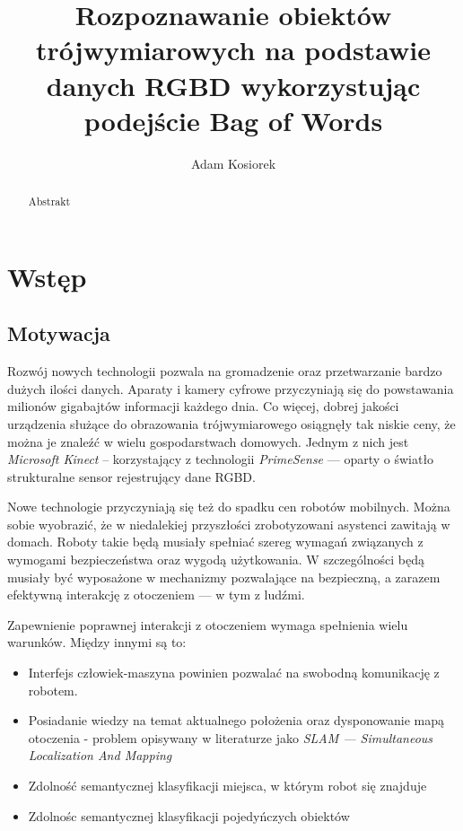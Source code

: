 \documentclass[a4paper,10pt]{article}
\title{Rozpoznawanie obiektów trójwymiarowych na podstawie danych RGBD wykorzystując podejście Bag of Words}
\author{Adam Kosiorek}
\begin{document}
\maketitle

\begin{abstract}

Abstrakt

\end{abstract}

\section{Wstęp}
\subsection{Motywacja}

  Rozwój nowych technologii pozwala na gromadzenie oraz przetwarzanie bardzo dużych ilości danych. Aparaty i kamery cyfrowe przyczyniają się do powstawania milionów gigabajtów informacji każdego dnia. Co więcej, dobrej jakości urządzenia służące do obrazowania trójwymiarowego osiągnęły tak niskie ceny, że można je znaleźć w wielu gospodarstwach domowych. Jednym z nich jest \textit{Microsoft Kinect} -- korzystający z technologii \textit{PrimeSense} --- oparty o światło strukturalne sensor rejestrujący dane RGBD.
  
  Nowe technologie przyczyniają się też do spadku cen robotów mobilnych. Można sobie wyobrazić, że w niedalekiej przyszłości zrobotyzowani asystenci zawitają w domach. Roboty takie będą musiały spełniać szereg wymagań związanych z wymogami bezpieczeństwa oraz wygodą użytkowania. W szczególności będą musiały być wyposażone w mechanizmy pozwalające na bezpieczną, a zarazem efektywną interakcję z otoczeniem --- w tym z ludźmi. 
  
  Zapewnienie poprawnej interakcji z otoczeniem wymaga spełnienia wielu warunków. Między innymi są to: 
  \begin{itemize}
   \item Interfejs człowiek-maszyna powinien pozwalać na swobodną komunikację z robotem.
   \item Posiadanie wiedzy na temat aktualnego położenia oraz dysponowanie mapą otoczenia - problem opisywany w literaturze jako \textit{SLAM --- Simultaneous Localization And Mapping}
   \item Zdolność semantycznej klasyfikacji miejsca, w którym robot się znajduje
   \item Zdolnośc semantycznej klasyfikacji pojedyńczych obiektów   
  \end{itemize}
  
\end{document}
